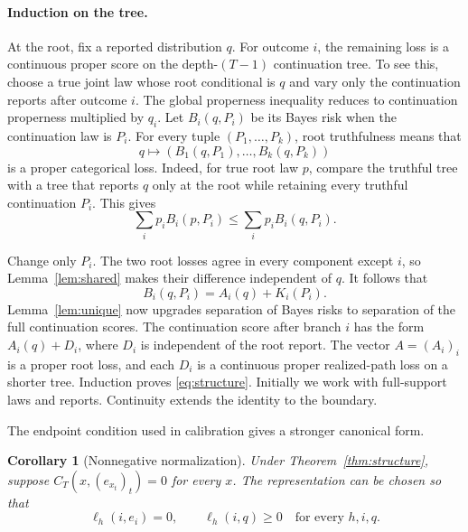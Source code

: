 \documentclass[twoside]{article}
\newtheorem{corollary}[theorem]{Corollary}
\newcommand{\1}{\mathbf 1}
\begin{document}
\paragraph{Induction on the tree.}
At the root, fix a reported distribution $q$. For outcome $i$, the remaining loss is a continuous proper score on the depth-$(T-1)$ continuation tree. To see this, choose a true joint law whose root conditional is $q$ and vary only the continuation reports after outcome $i$. The global properness inequality reduces to continuation properness multiplied by $q_i$. Let $B_i(q,P_i)$ be its Bayes risk when the continuation law is $P_i$. For every tuple $(P_1,\ldots,P_k)$, root truthfulness means that
\begin{equation*}
 q\longmapsto (B_1(q,P_1),\ldots,B_k(q,P_k))
\end{equation*}
is a proper categorical loss. Indeed, for true root law $p$, compare the truthful tree with a tree that reports $q$ only at the root while retaining every truthful continuation $P_i$. This gives
\begin{equation*}
 \sum_i p_i B_i(p,P_i)\leq\sum_i p_i B_i(q,P_i).
\end{equation*}

Change only $P_i$. The two root losses agree in every component except $i$, so Lemma~\ref{lem:shared} makes their difference independent of $q$. It follows that
\begin{equation}
 B_i(q,P_i)=A_i(q)+K_i(P_i).
 \label{eq:bayes-separation}
\end{equation}
Lemma~\ref{lem:unique} now upgrades separation of Bayes risks to separation of the full continuation scores. The continuation score after branch $i$ has the form $A_i(q)+D_i$, where $D_i$ is independent of the root report. The vector $A=(A_i)_i$ is a proper root loss, and each $D_i$ is a continuous proper realized-path loss on a shorter tree. Induction proves \eqref{eq:structure}. Initially we work with full-support laws and reports. Continuity extends the identity to the boundary.

The endpoint condition used in calibration gives a stronger canonical form.

\begin{corollary}[Nonnegative normalization]
\label{cor:normalize}
Under Theorem~\ref{thm:structure}, suppose $C_T(x,(e_{x_t})_t)=0$ for every $x$. The representation can be chosen so that
\begin{equation}
 \ell_h(i,e_i)=0,\qquad \ell_h(i,q)\geq0
 \quad\text{for every }h,i,q.
 \label{eq:normalized}
\end{equation}
\end{corollary}
\end{document}
